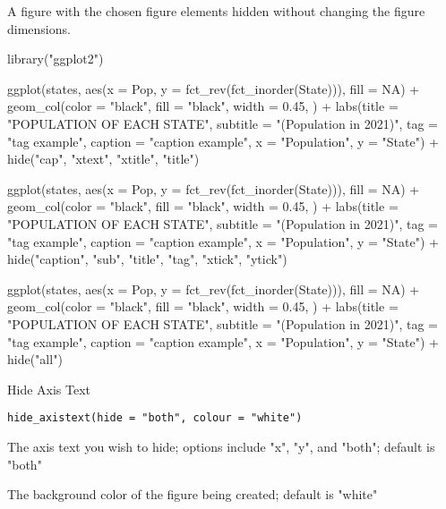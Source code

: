 \documentclass[a4paper]{book}
\begin{document}
%
\begin{Value}
A figure with the chosen figure elements hidden without changing the figure dimensions.
\end{Value}
%
\begin{Examples}
\begin{ExampleCode}
library("ggplot2")

ggplot(states, aes(x = Pop, y = fct_rev(fct_inorder(State))), fill = NA) +
geom_col(color = "black", fill = "black", width = 0.45, ) +
labs(title = "POPULATION OF EACH STATE",
    subtitle = "(Population in 2021)",
    tag = "tag example",
    caption = "caption example",
    x = "Population",
    y = "State") +
    hide("cap", "xtext", "xtitle", "title")

ggplot(states, aes(x = Pop, y = fct_rev(fct_inorder(State))), fill = NA) +
geom_col(color = "black", fill = "black", width = 0.45, ) +
labs(title = "POPULATION OF EACH STATE",
    subtitle = "(Population in 2021)",
    tag = "tag example",
    caption = "caption example",
    x = "Population",
    y = "State") +
    hide("caption", "sub", "title", "tag", "xtick", "ytick")

ggplot(states, aes(x = Pop, y = fct_rev(fct_inorder(State))), fill = NA) +
geom_col(color = "black", fill = "black", width = 0.45, ) +
labs(title = "POPULATION OF EACH STATE",
    subtitle = "(Population in 2021)",
    tag = "tag example",
    caption = "caption example",
    x = "Population",
    y = "State") +
    hide("all")
\end{ExampleCode}
\end{Examples}
%
\begin{Description}\relax
Hide Axis Text
\end{Description}
%
\begin{Usage}
\begin{verbatim}
hide_axistext(hide = "both", colour = "white")
\end{verbatim}
\end{Usage}
%
\begin{Arguments}
\begin{ldescription}
\item[\code{hide}] The axis text you wish to hide; options include "x", "y", and "both"; default is "both"

\item[\code{colour}] The background color of the figure being created; default is "white"
\end{ldescription}
\end{Arguments}
\end{document}
